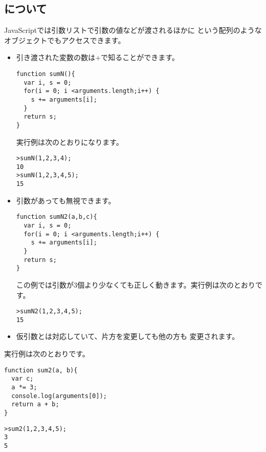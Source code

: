 \subsection{\protect{}について}\label{argumentsSum}
JavaScriptでは引数リストで引数の値などが渡されるほかに
という配列のようなオブジェクトでもアクセスできます。
\begin{itemize}
 \item 引き渡された変数の数は+で知ることができます。
\begin{Verbatim}
function sumN(){
  var i, s = 0;
  for(i = 0; i <arguments.length;i++) {
    s += arguments[i];
  }
  return s;
}
\end{Verbatim}
			 実行例は次のとおりになります。
\begin{Verbatim}
>sumN(1,2,3,4);
10
>sumN(1,2,3,4,5);
15
\end{Verbatim}
 \item 引数があっても無視できます。
\begin{Verbatim}
function sumN2(a,b,c){
  var i, s = 0;
  for(i = 0; i <arguments.length;i++) {
    s += arguments[i];
  }
  return s;
}
\end{Verbatim}
この例では引数が3個より少なくても正しく動きます。実行例は次のとおりです。
\begin{Verbatim}
>sumN2(1,2,3,4,5);
15

\end{Verbatim}
 \item 仮引数とは対応していて、片方を変更しても他の方も
       変更されます。
\end{itemize}
実行例は次のとおりです。
\begin{Verbatim}
function sum2(a, b){
  var c;
  a *= 3;
  console.log(arguments[0]);
  return a + b;
}
\end{Verbatim}
\begin{Verbatim}
>sum2(1,2,3,4,5);
3 
5
\end{Verbatim}

